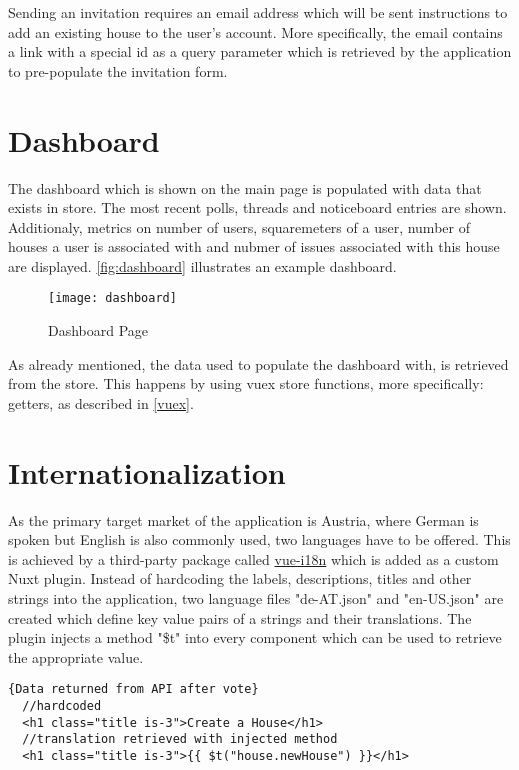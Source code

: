 Sending an invitation requires an email address which will be sent instructions to add an existing house to the user's account. More specifically, the email contains a link with a special id as a query parameter which is retrieved by the application to pre-populate the invitation form.  

\section{Dashboard}
The dashboard which is shown on the main page is populated with data that exists in store. The most recent polls, threads and noticeboard entries are shown. Additionaly, metrics on number of users, squaremeters of a user, number of houses a user is associated with and nubmer of issues associated with this house are displayed. \autoref{fig:dashboard} illustrates an example dashboard.

\begin{figure}[H]
  \begin{center}
  \texttt{[image: dashboard]}
  \end{center}
  \caption{Dashboard Page}
  \label{fig:dashboard}
\end{figure}

As already mentioned, the data used to populate the dashboard with, is retrieved from the store. This happens by using vuex store functions, more specifically: getters, as described in \autoref{vuex}. 

\section{Internationalization} \label{sec:internationalization}
As the primary target market of the application is Austria, where German is spoken but English is also commonly used, two languages have to be offered. This is achieved by a third-party package called \href{https://github.com/kazupon/vue-i18n}{vue-i18n} which is added as a custom Nuxt plugin. Instead of hardcoding the labels, descriptions, titles and other strings into the application, two language files "de-AT.json" and "en-US.json" are created which define key value pairs of a strings and their translations. The plugin injects a method "\$t" into every component which can be used to retrieve the appropriate value. \newline

\begin{lstlisting}[caption=Data returned from API after vote, captionpos=b, style=htmlcssjs, label=apidatavoting]{Data returned from API after vote}
  //hardcoded
  <h1 class="title is-3">Create a House</h1>
  //translation retrieved with injected method
  <h1 class="title is-3">{{ $t("house.newHouse") }}</h1>
\end{lstlisting}


